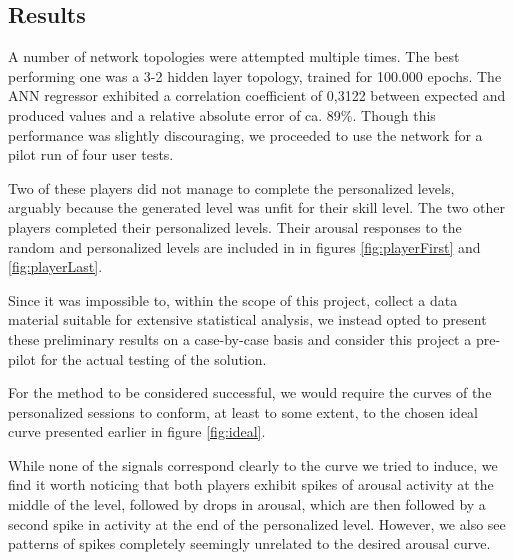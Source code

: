 \documentclass{llncs}
\begin{document}
\subsection{Results}
A number of network topologies were attempted multiple times. The best performing one was a 3-2 hidden layer topology, trained for 100.000 epochs. The ANN regressor exhibited a correlation coefficient of 0,3122 between expected and produced values and a relative absolute error of ca. 89\%. Though this performance was slightly discouraging, we proceeded to use the network for a pilot run of four user tests.

Two of these players did not manage to complete the personalized levels, arguably because the generated level was unfit for their skill level.
The two other players completed their personalized levels. Their arousal responses to the random and personalized levels are included in in figures \ref{fig:playerFirst} and \ref{fig:playerLast}.

Since it was impossible to, within the scope of this project, collect a data material suitable for extensive statistical analysis, we instead opted to present these preliminary results on a case-by-case basis and consider this project a pre-pilot for the actual testing of the solution.

For the method to be considered successful, we would require the curves of the personalized sessions to conform, at least to some extent, to the chosen ideal curve presented earlier in figure \ref{fig:ideal}.

While none of the signals correspond clearly to the curve we tried to induce, we find it worth noticing that both players exhibit spikes of arousal activity at the middle of the level, followed by drops in arousal, which are then followed by a second spike in activity at the end of the personalized level.
However, we also see patterns of spikes completely seemingly unrelated to the desired arousal curve.
\end{document}
